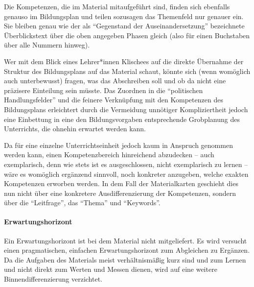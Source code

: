 Die Kompetenzen, die im Material mitaufgeführt sind, finden sich ebenfalls genauso im Bildungsplan und teilen sozusagen das Themenfeld nur genauer ein. Sie bleiben genau wie der als \enquote{Gegenstand der Auseinandersetzung} bezeichnete Überblickstext über die oben angegeben Phasen gleich (also für einen Buchstaben über alle Nummern hinweg). 



Wer mit dem Blick eines Lehrer*innen Klischees auf die direkte Übernahme der Struktur des Bildungsplans auf das Material schaut, könnte sich (wenn womöglich auch unterbewusst) fragen, was das Abschreiben soll und ob da nicht eine präzisere Einteilung sein müsste.
Das Zuordnen in die \enquote{politischen Handlungsfelder} und die feinere Verknüpfung mit den Kompetenzen des Bildungsplans erleichtert durch die Vermeidung unnötiger Kompliziertheit jedoch eine Einbettung in eine den Bildungsvorgaben entsprechende Grobplanung des Unterrichts, die ohnehin erwartet werden kann.




Da für eine einzelne Unterrichtseinheit jedoch kaum in Anspruch genommen werden kann, einen Kompetenzbereich hinreichend abzudecken -- auch exemplarisch, denn wie stets ist es ausgeschlossen, nicht exemplarisch zu lernen  -- wäre es womöglich ergänzend sinnvoll, noch konkreter anzugeben, welche exakten Kompetenzen erworben werden.
In dem Fall der Materialkarten geschieht dies nun nicht über eine konkretere Ausdifferenzierung der Kompetenzen, sondern über die \enquote{Leitfrage}, das \enquote{Thema} und \enquote{Keywords}. 


\paragraph{Erwartungshorizont}
Ein Erwartungshorizont ist bei dem Material nicht mitgeliefert.
Es wird versucht einen pragmatischen, einfachen Erwartungshorizont zum Abgleichen zu Ergänzen. Da die Aufgaben des Materials meist verhältnismäßig kurz sind und zum Lernen und nicht direkt zum Werten und Messen dienen, wird auf eine weitere Binnendifferenzierung verzichtet. 

